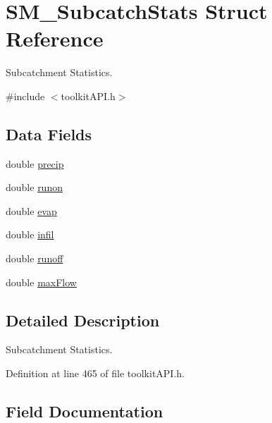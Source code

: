 \hypertarget{struct_s_m___subcatch_stats}{}\section{S\+M\+\_\+\+Subcatch\+Stats Struct Reference}
\label{struct_s_m___subcatch_stats}


Subcatchment Statistics.  




{\ttfamily \#include $<$toolkit\+A\+P\+I.\+h$>$}

\subsection*{Data Fields}
\begin{DoxyCompactItemize}
\item 
double \mbox{\hyperlink{struct_s_m___subcatch_stats_a98bbe0990fa7260a158db1f443480e86}{precip}}
\item 
double \mbox{\hyperlink{struct_s_m___subcatch_stats_ac05f157303936535978c7e69f6dfb16f}{runon}}
\item 
double \mbox{\hyperlink{struct_s_m___subcatch_stats_aac3c1df7592191453d2ff02e5ff1b7e6}{evap}}
\item 
double \mbox{\hyperlink{struct_s_m___subcatch_stats_a6cd5b8d39e713bd1618a254d53def9b2}{infil}}
\item 
double \mbox{\hyperlink{struct_s_m___subcatch_stats_a4dcd362194c38698fe8f5b2659ba2dc6}{runoff}}
\item 
double \mbox{\hyperlink{struct_s_m___subcatch_stats_a4d84bca5454f3903c44fe865e44674f5}{max\+Flow}}
\end{DoxyCompactItemize}


\subsection{Detailed Description}
Subcatchment Statistics. 

Definition at line 465 of file toolkit\+A\+P\+I.\+h.



\subsection{Field Documentation}
\mbox{\label{struct_s_m___subcatch_stats_aac3c1df7592191453d2ff02e5ff1b7e6}} 
